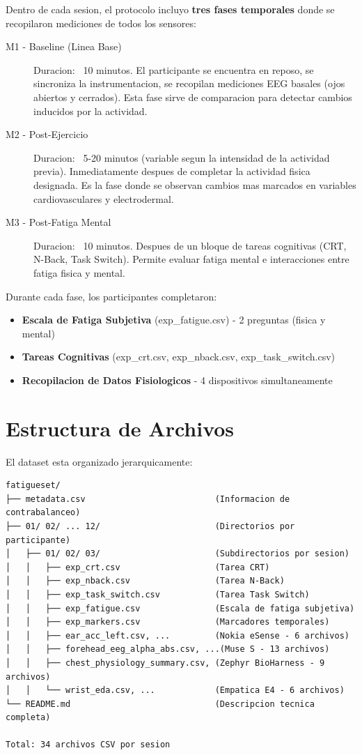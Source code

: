 Dentro de cada sesion, el protocolo incluyo \textbf{tres fases temporales} donde
se recopilaron mediciones de todos los sensores:

\begin{description}
    \item[M1 - Baseline (Linea Base)]
    Duracion: ~10 minutos. El participante se encuentra en reposo, se sincroniza
    la instrumentacion, se recopilan mediciones EEG basales (ojos abiertos y cerrados).
    Esta fase sirve de comparacion para detectar cambios inducidos por la actividad.

    \item[M2 - Post-Ejercicio]
    Duracion: ~5-20 minutos (variable segun la intensidad de la actividad previa).
    Inmediatamente despues de completar la actividad fisica designada. Es la fase
    donde se observan cambios mas marcados en variables cardiovasculares y electrodermal.

    \item[M3 - Post-Fatiga Mental]
    Duracion: ~10 minutos. Despues de un bloque de tareas cognitivas (CRT, N-Back, Task Switch).
    Permite evaluar fatiga mental e interacciones entre fatiga fisica y mental.
\end{description}

Durante cada fase, los participantes completaron:
\begin{itemize}
    \item \textbf{Escala de Fatiga Subjetiva} (exp\_fatigue.csv) - 2 preguntas (fisica y mental)
    \item \textbf{Tareas Cognitivas} (exp\_crt.csv, exp\_nback.csv, exp\_task\_switch.csv)
    \item \textbf{Recopilacion de Datos Fisiologicos} - 4 dispositivos simultaneamente
\end{itemize}

\section{Estructura de Archivos}

El dataset esta organizado jerarquicamente:

\begin{verbatim}
fatigueset/
├── metadata.csv                          (Informacion de contrabalanceo)
├── 01/ 02/ ... 12/                       (Directorios por participante)
│   ├── 01/ 02/ 03/                       (Subdirectorios por sesion)
│   │   ├── exp_crt.csv                   (Tarea CRT)
│   │   ├── exp_nback.csv                 (Tarea N-Back)
│   │   ├── exp_task_switch.csv           (Tarea Task Switch)
│   │   ├── exp_fatigue.csv               (Escala de fatiga subjetiva)
│   │   ├── exp_markers.csv               (Marcadores temporales)
│   │   ├── ear_acc_left.csv, ...         (Nokia eSense - 6 archivos)
│   │   ├── forehead_eeg_alpha_abs.csv, ...(Muse S - 13 archivos)
│   │   ├── chest_physiology_summary.csv, (Zephyr BioHarness - 9 archivos)
│   │   └── wrist_eda.csv, ...            (Empatica E4 - 6 archivos)
└── README.md                             (Descripcion tecnica completa)

Total: 34 archivos CSV por sesion
\end{verbatim}

